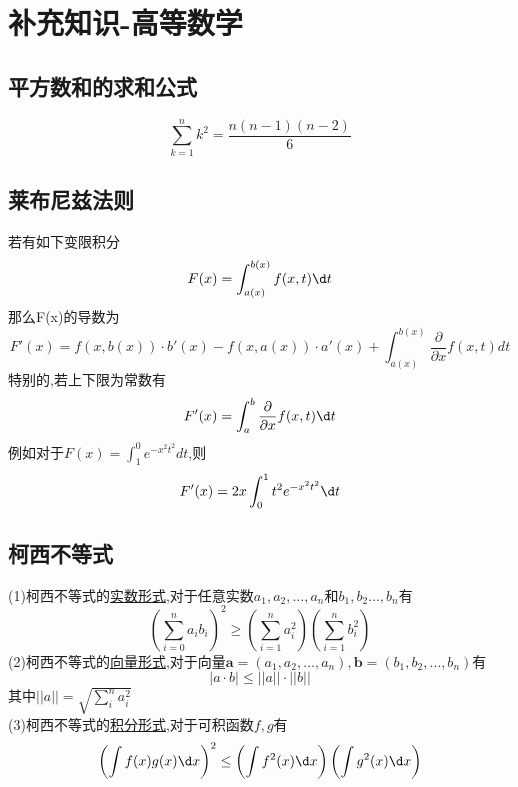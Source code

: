 \documentclass[12pt, a4paper, oneside, UTF8]{ctexbook}
\begin{document}

\else
\fi
\chapter {补充知识-高等数学}

\section{平方数和的求和公式}
\[
\sum_{k=1}^{n}k^2=\frac{n(n-1)(n-2)}{6}
\]
\section{莱布尼兹法则}
若有如下变限积分
\[
F(x)=\int_{a(x)}^{b(x)}f(x,t)\d t 
\]
那么F(x)的导数为 
\[
F'(x) = f(x, b(x)) \cdot b'(x) - f(x, a(x)) \cdot a'(x) + \int_{a(x)}^{b(x)} \frac{\partial}{\partial x} f(x, t) dt
\]
特别的,若上下限为常数有 
\[
F'(x) = \int_{a}^{b}\frac{\partial}{\partial x}f(x,t)\d t
\]
例如对于$F(x)=\int_{1}^{0}e^{-x^2t^2}dt$,则 
\[
F'(x)=2x\int_{0}^{1}t^2e^{-x^2t^2}\d t
\]

\section{柯西不等式}
(1)柯西不等式的\underline{实数形式},对于任意实数$a_1,a_2,\ldots,a_n$和$b_1,b_2\ldots,b_n$有
$$
\left(\sum_{i=0}^{n}a_ib_i\right)^2\geq\left(\sum_{i=1}^{n}a_i^2\right)\left(\sum_{i=1}^{n}b_i^2\right)
$$
(2)柯西不等式的\underline{向量形式},对于向量$\textbf{a}=(a_1,a_2,\ldots,a_n),\textbf{b}=(b_1,b_2,\ldots,b_n)$有
$$
\left|a\cdot b\right|\leq \left|\left|a\right|\right|\cdot\left|\left|b\right|\right|
$$
其中$\displaystyle \left|\left|a\right|\right|=\sqrt{\sum_{i}^{n}a^2_i}$ \\
(3)柯西不等式的\underline{积分形式},对于可积函数$f,g$有
$$
\left(\int f(x)g(x)\d x\right)^2\leq\left(\int f^2(x)\d x\right)\left(\int g^2(x)\d x\right)
$$
\ifx\allfiles\undefined
\end{document}
